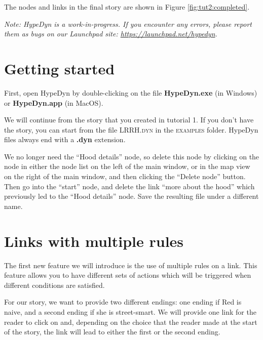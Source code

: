 \documentclass{article}
\begin{document}
The nodes and links in the final story are shown in Figure \ref{fig:tut2:completed}.

\textit{Note:  HypeDyn is a work-in-progress. If you encounter any errors, please
report them as bugs on our Launchpad site: \url{https://launchpad.net/hypedyn}.}

\section{Getting started}

First, open HypeDyn by double-clicking on the file \textbf{HypeDyn.exe} (in
Windows) or \textbf{HypeDyn.app} (in MacOS).

We will continue from the story that you created in tutorial 1. If you don't
have the story, you can start from the file \textsc{LRRH.dyn} in the
\textsc{examples} folder. HypeDyn files always end with a \textbf{.dyn} extension.


We no longer need the ``Hood details'' node, so delete this node by clicking on
the node in either the node list on the left of the main window, or in the
map view on the right of the main window, and then clicking the ``Delete node''
button. Then go into the ``start'' node, and delete the link ``more about
the hood'' which previously led to the ``Hood details'' node. Save the resulting
file under a different name.


\section{Links with multiple rules}

The first new feature we will introduce is the use of multiple rules on a link.
This feature allows you to have different sets of actions which will be
triggered when different conditions are satisfied.

For our story, we want to provide two different endings: one ending if Red is
naive, and a second ending if she is street-smart. We will provide one link for
the reader to click on and, depending on the choice that the reader made at the
start of the story, the link will lead to either the first or the second ending.
\end{document}
